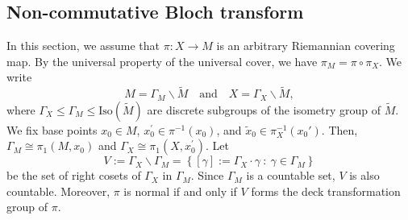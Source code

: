 \documentclass[11pt,oneside,reqno]{amsart}
\theoremstyle{definition}
\newtheorem{definition}{Definition}[section]
\numberwithin{equation}{section}
\theoremstyle{plain}
\begin{document}


\subsection{Non-commutative Bloch transform}\label{subs:noncBloch}

In this section, we assume that $\pi:X\to M$ is an arbitrary Riemannian covering map. By the universal property of the universal cover, we have $\pi_M=\pi\circ \pi_{X}$. We write 
\begin{equation*}
    M=\Gamma_{M}\backslash\widetilde{M} \quad\text{and}\quad X=\Gamma_{X}\backslash\widetilde{M},
\end{equation*}
where $\Gamma_{X}\leqslant \Gamma_{M}\leqslant \mathrm{Iso}(\widetilde{M})$ are discrete subgroups of the isometry group of $\widetilde{M}$. We fix base points $x_{0} \in M$, $x_{0}^{\prime} \in \pi^{-1}(x_0)$, and $\widetilde{x}_0\in \pi_X^{-1}(x_0')$. Then, $\Gamma_{M}\cong \pi_{1}(M,x_0)$ and $\Gamma_{X}\cong \pi_{1}(X,x_0^{\prime})$. Let 
\begin{equation}\label{defineV}
    V:=\Gamma_{X}\backslash\Gamma_{M}=\left\{\left[\gamma\right]:=\Gamma_{X} \cdot \gamma \ : \ \gamma\in \Gamma_{M}\right\}
\end{equation}
be the set of right cosets of $\Gamma_{X}$ in $\Gamma_M$. Since $\Gamma_{M}$ is a countable set, $V$ is also countable. Moreover, $\pi$ is normal if and only if $V$ forms the deck transformation group of $\pi$. 
\end{document}
